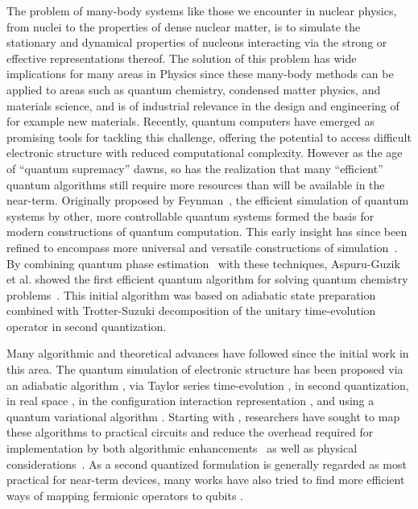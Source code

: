 \documentclass[10pt]{article}
\begin{document}
The problem of many-body systems like those we encounter in nuclear physics, from nuclei to the properties of dense nuclear matter,  is to simulate the stationary and dynamical 
properties of nucleons interacting via the strong or effective representations thereof. The solution of this problem has wide implications for many areas in Physics since these many-body methods can be applied to areas such as
quantum chemistry, condensed matter physics, and materials science,
and is of industrial relevance in the design and engineering of for example new materials. 
Recently, quantum computers
have emerged as promising tools for tackling this challenge, offering
the potential to access difficult electronic structure with reduced
computational complexity. However as the age of ``quantum supremacy''
dawns, so has the realization that many ``efficient'' quantum
algorithms still require more resources than will be available in the
near-term.
Originally proposed by Feynman~\cite{Feynman1982}, the efficient
simulation of quantum systems by other, more controllable quantum
systems formed the basis for modern constructions of quantum
computation.  This early insight has since been refined to encompass
more universal and versatile constructions of
simulation~\cite{Lloyd1996,Abrams1997}. By combining quantum phase
estimation~\cite{Kitaev1995} with these techniques, Aspuru-Guzik et
al. showed the first efficient quantum algorithm for solving quantum
chemistry problems~\cite{Aspuru-Guzik2005}. This initial algorithm was
based on adiabatic state preparation combined with Trotter-Suzuki
decomposition of the unitary time-evolution operator
\cite{Trotter1959,Suzuki1993} in second quantization.

Many algorithmic and theoretical advances have followed since the
initial work in this area. The quantum simulation of electronic
structure has been proposed via an adiabatic algorithm
\cite{BabbushAQChem}, via Taylor series time-evolution
\cite{BabbushSparse1}, in second quantization, in real space
\cite{Kassal2008,Kivlichan2016}, in the configuration interaction
representation \cite{Toloui2013,BabbushSparse2}, and using a quantum
variational algorithm \cite{Peruzzo2013,McClean2015}. Starting with
\cite{Whitfield2010}, researchers have sought to map these algorithms
to practical circuits and reduce the overhead required for
implementation by both algorithmic
enhancements~\cite{Wecker2014,Poulin2014,Hastings2015,Romero2017} as
well as physical considerations~\cite{BabbushTrotter,McClean2014}. As
a second quantized formulation is generally regarded as most practical
for near-term devices, many works have also tried to find more
efficient ways of mapping fermionic operators to qubits
\cite{Seeley2012,Tranter2015,Whitfield2016,Bravyi2017,Havlicek2017}.
\end{document}
